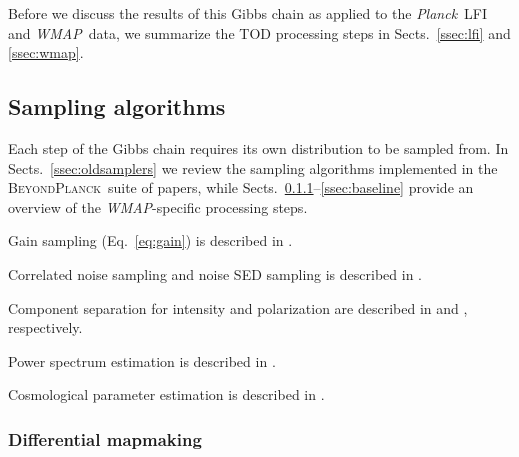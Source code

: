 \documentclass[twocolumn]{../../common/aa}
\def\WMAP{\emph{WMAP}}
\def\Planck{\emph{Planck}}
\newcommand{\bp}{\textsc{BeyondPlanck}}
\begin{document}
Before we discuss the results of this Gibbs chain as applied to the \Planck\ LFI and \WMAP\ data, we summarize the TOD processing steps in Sects.~\ref{ssec:lfi} and \ref{ssec:wmap}.



\subsection{Sampling algorithms}

Each step of the Gibbs chain requires its own distribution to be sampled from. In Sects.~\ref{ssec:oldsamplers} we review the sampling algorithms implemented in the \bp\ suite of papers, while Sects.~\ref{ssec:mapmaking}--\ref{ssec:baseline} provide an overview of the \WMAP-specific processing steps.


Gain sampling (Eq.~\eqref{eq:gain}) is described in \citet{bp06}.

Correlated noise sampling and noise SED sampling is described in \citet{bp07}.

Component separation for intensity and polarization are described in \citet{bp13} and \citet{bp14}, respectively.

Power spectrum estimation is described in \citet{bp10}.

Cosmological parameter estimation is described in \citet{bp11}.


\subsubsection{Differential mapmaking}
\label{ssec:mapmaking}
\end{document}
